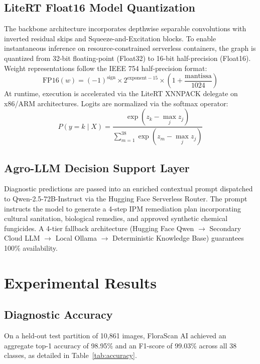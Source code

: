 \documentclass[conference]{IEEEtran}
\begin{document}
\subsection{LiteRT Float16 Model Quantization}
The backbone architecture incorporates depthwise separable convolutions with inverted residual skips and Squeeze-and-Excitation blocks. To enable instantaneous inference on resource-constrained serverless containers, the graph is quantized from 32-bit floating-point (Float32) to 16-bit half-precision (Float16). Weight representations follow the IEEE 754 half-precision format:
\begin{equation}
\text{FP16}(w) = (-1)^{\text{sign}} \times 2^{\text{exponent} - 15} \times \left(1 + \frac{\text{mantissa}}{1024}\right)
\end{equation}
At runtime, execution is accelerated via the LiteRT XNNPACK delegate on x86/ARM architectures. Logits are normalized via the softmax operator:
\begin{equation}
P(y = k \mid X) = \frac{\exp(z_k - \max_j z_j)}{\sum_{m=1}^{38} \exp(z_m - \max_j z_j)}
\end{equation}

\subsection{Agro-LLM Decision Support Layer}
Diagnostic predictions are passed into an enriched contextual prompt dispatched to Qwen-2.5-72B-Instruct via the Hugging Face Serverless Router. The prompt instructs the model to generate a 4-step IPM remediation plan incorporating cultural sanitation, biological remedies, and approved synthetic chemical fungicides. A 4-tier fallback architecture (Hugging Face Qwen $\to$ Secondary Cloud LLM $\to$ Local Ollama $\to$ Deterministic Knowledge Base) guarantees 100\% availability.

\section{Experimental Results}

\subsection{Diagnostic Accuracy}
On a held-out test partition of 10,861 images, FloraScan AI achieved an aggregate top-1 accuracy of 98.95\% and an F1-score of 99.03\% across all 38 classes, as detailed in Table~\ref{tab:accuracy}.
\end{document}
